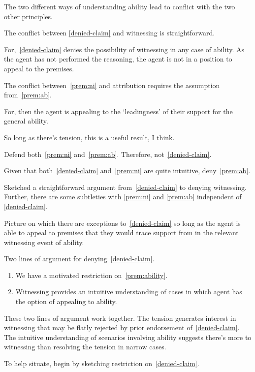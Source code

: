 \documentclass[10pt]{article}
\begin{document}
\begin{note}
  The two different ways of understanding ability lead to conflict with the two other principles.
\end{note}

\begin{note}[Witnessing]
  The conflict between \ref{denied-claim} and witnessing is straightforward.

  For,~\ref{denied-claim} denies the possibility of witnessing in any case of ability.
  As the agent has not performed the reasoning, the agent is not in a position to appeal to the premises.
\end{note}

\begin{note}[Attribution]
  The conflict between~\ref{prem:ni} and attribution requires the assumption from~\ref{prem:ab}.

  For, then the agent is appealing to the `leadingness' of their support for the general ability.
\end{note}

\begin{note}
  So long as there's tension, this is a useful result, I think.
\end{note}

\begin{note}
  Defend both~\ref{prem:ni} and~\ref{prem:ab}.
  Therefore, not~\ref{denied-claim}.

  Given that both~\ref{denied-claim} and~\ref{prem:ni} are quite intuitive, deny~\ref{prem:ab}.

  Sketched a straightforward argument from~\ref{denied-claim} to denying witnessing.
  Further, there are some subtleties with \ref{prem:ni} and \ref{prem:ab} independent of \ref{denied-claim}.

  Picture on which there are exceptions to~\ref{denied-claim} so long as the agent is able to appeal to premises that they would trace support from in the relevant witnessing event of ability.

  Two lines of argument for denying~\ref{denied-claim}.
  \begin{enumerate}
  \item We have a motivated restriction on~\ref{prem:ability}.
  \item Witnessing provides an intuitive understanding of cases in which agent has the option of appealing to ability.
  \end{enumerate}
  These two lines of argument work together.
  The tension generates interest in witnessing that may be flatly rejected by prior endorsement of~\ref{denied-claim}.
  The intuitive understanding of scenarios involving ability suggests there's more to witnessing than resolving the tension in narrow cases.

  To help situate, begin by sketching restriction on~\ref{denied-claim}.
\end{note}
\end{document}

